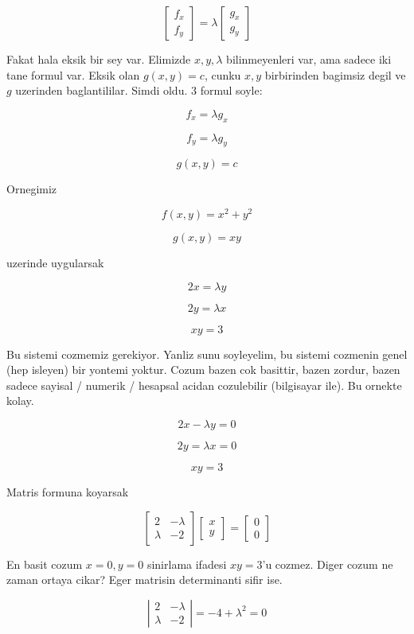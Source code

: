 \documentclass[12pt,fleqn]{article}
\begin{document}
\[ 
\left[\begin{array}{r}
f_x \\
f_y
\end{array}\right]  = 
\lambda
\left[\begin{array}{r}
g_x \\
g_y
\end{array}\right]
 \]

Fakat hala eksik bir sey var. Elimizde $x,y,\lambda$ bilinmeyenleri var,
ama sadece iki tane formul var. Eksik olan $g(x,y) = c$, cunku $x,y$
birbirinden bagimsiz degil ve $g$ uzerinden baglantililar. Simdi oldu. 3
formul soyle:

\[ f_x = \lambda g_x \]

\[ f_y = \lambda g_y \]

\[ g(x,y) = c \]

Ornegimiz 

\[ f(x,y) = x^2 + y^2 \]

\[ g(x,y) = xy  \]

uzerinde uygularsak

\[ 2x = \lambda y \]

\[ 2y = \lambda x \]

\[ xy = 3 \]

Bu sistemi cozmemiz gerekiyor. Yanliz sunu soyleyelim, bu sistemi cozmenin
genel (hep isleyen) bir yontemi yoktur. Cozum bazen cok basittir, bazen
zordur, bazen sadece sayisal / numerik / hesapsal acidan cozulebilir
(bilgisayar ile). Bu ornekte kolay. 

\[ 2x - \lambda y = 0\]

\[ 2y= \lambda x = 0 \]

\[ xy = 3 \]

Matris formuna koyarsak

\[ 
\left[\begin{array}{rr}
2 & -\lambda \\
\lambda & -2
\end{array}\right]
\left[\begin{array}{r}
x \\ y
\end{array}\right]
=
\left[\begin{array}{r}
0 \\ 0
\end{array}\right]
 \]

En basit cozum $x=0,y=0$ sinirlama ifadesi $xy=3$'u cozmez. Diger cozum ne
zaman ortaya cikar? Eger matrisin determinanti sifir ise. 

\[ 
\left|\begin{array}{rr}
2 & -\lambda \\
\lambda & -2
\end{array}\right| = -4 + \lambda^2 = 0
 \]
\end{document}
